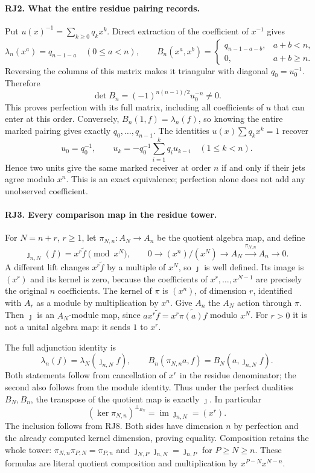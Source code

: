 \paragraph{RJ2. What the entire residue pairing records.}
Put $u(x)^{-1}=\sum_{k\ge0}q_kx^k$. Direct extraction of the
coefficient of $x^{-1}$ gives
\[
 \lambda_n(x^a)=q_{n-1-a}\quad(0\le a<n),\qquad
 B_n(x^a,x^b)=
 \begin{cases}q_{n-1-a-b},&a+b<n,\\0,&a+b\ge n.\end{cases}
 \tag{RJ4}
\]
Reversing the columns of this matrix makes it triangular with diagonal
$q_0=u_0^{-1}$. Therefore
\[
 \det B_n=(-1)^{n(n-1)/2}u_0^{-n}\ne0.
 \tag{RJ5}
\]
This proves perfection with its full matrix, including all coefficients
of $u$ that can enter at this order. Conversely, $B_n(1,f)=\lambda_n(f)$,
so knowing the entire marked pairing gives exactly $q_0,\ldots,q_{n-1}$.
The identities $u(x)\sum q_kx^k=1$ recover
\[
 u_0=q_0^{-1},\qquad
 u_k=-q_0^{-1}\sum_{i=1}^k q_i u_{k-i}\quad(1\le k<n).
 \tag{RJ6}
\]
Hence two units give the same marked receiver at order $n$ if and
only if their jets agree modulo $x^n$. This is an exact equivalence;
perfection alone does not add any unobserved coefficient.

\paragraph{RJ3. Every comparison map in the residue tower.}
For $N=n+r$, $r\ge1$, let $\pi_{N,n}:A_N\to A_n$ be the quotient
algebra map, and define
\[
 \jmath_{n,N}(f)=x^r\widetilde f\pmod{x^N},
 \qquad
 0\longrightarrow (x^n)/(x^N)\longrightarrow A_N
       \xrightarrow{\pi_{N,n}}A_n\longrightarrow0.
 \tag{RJ7}
\]
A different lift changes $x^r\widetilde f$ by a multiple of $x^N$,
so $\jmath$ is well defined. Its image is $(x^r)$ and its kernel is
zero, because the coefficients of $x^r,\ldots,x^{N-1}$ are precisely
the original $n$ coefficients. The kernel of $\pi$ is $(x^n)$,
of dimension $r$, identified with $A_r$ as a module by multiplication
by $x^n$. Give $A_n$ the $A_N$ action through $\pi$. Then
$\jmath$ is an $A_N$-module map, since
$a x^r\widetilde f=x^r\widetilde{\pi(a)f}$ modulo $x^N$.
For $r>0$ it is not a unital algebra map: it sends $1$ to $x^r$.

The full adjunction identity is
\[
 \boxed{\lambda_n(f)=\lambda_N(\jmath_{n,N}f),\qquad
 B_n(\pi_{N,n}a,f)=B_N(a,\jmath_{n,N}f).}
 \tag{RJ8}
\]
Both statements follow from cancellation of $x^r$ in the residue
denominator; the second also follows from the module identity. Thus
under the perfect dualities $B_N,B_n$, the transpose of the quotient
map is exactly $\jmath$. In particular
\[
 (\ker\pi_{N,n})^{\perp_{B_N}}=\operatorname{im}\jmath_{n,N}=(x^r).
 \tag{RJ9}
\]
The inclusion follows from RJ8. Both sides have dimension $n$ by
perfection and the already computed kernel dimension, proving equality.
Composition retains the whole tower:
$\pi_{N,n}\pi_{P,N}=\pi_{P,n}$ and
$\jmath_{N,P}\jmath_{n,N}=\jmath_{n,P}$ for $P\ge N\ge n$.
These formulas are literal quotient composition and multiplication
by $x^{P-N}x^{N-n}$.

